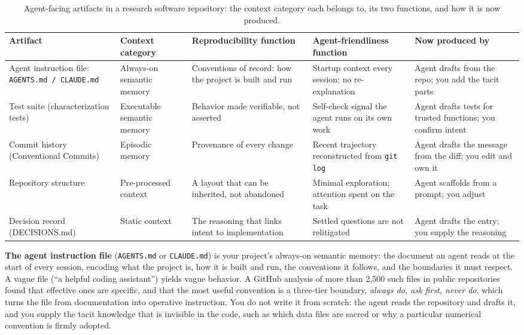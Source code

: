 \documentclass{IEEEcsmag}
\begin{document}
\begin{table}[t]
\caption{Agent-facing artifacts in a research software repository: the context category each belongs to, its two functions, and how it is now produced.}
\label{tab:artifacts}
\centering
\footnotesize
\setlength{\tabcolsep}{4pt}
\renewcommand{\arraystretch}{1.15}
\begin{tabularx}{\textwidth}{@{}*{5}{>{\raggedright\arraybackslash}X}@{}}
\toprule
\textbf{Artifact} & \textbf{Context category} & \textbf{Reproducibility function} & \textbf{Agent-friendliness function} & \textbf{Now produced by} \\
\midrule
Agent instruction file: \texttt{AGENTS.md / CLAUDE.md} & Always-on semantic memory & Conventions of record: how the project is built and run & Startup context every session; no re-explanation & Agent drafts from the repo; you add the tacit parts \\
Test suite (characterization tests) & Executable semantic memory & Behavior made verifiable, not asserted & Self-check signal the agent runs on its own work & Agent drafts tests for trusted functions; you confirm intent \\
Commit history (Conventional Commits) & Episodic memory & Provenance of every change & Recent trajectory reconstructed from \texttt{git log} & Agent drafts the message from the diff; you edit and own it \\
Repository structure & Pre-processed context & A layout that can be inherited, not abandoned & Minimal exploration; attention spent on the task & Agent scaffolds from a prompt; you adjust \\
Decision record (DECISIONS.md) & Static context & The reasoning that links intent to implementation & Settled questions are not relitigated & Agent drafts the entry; you supply the reasoning \\
\bottomrule
\end{tabularx}
\end{table}

\textbf{The agent instruction file} (\texttt{AGENTS.md} or \texttt{CLAUDE.md}) is your project's always-on semantic memory: the document an agent reads at the start of every session, encoding what the project is, how it is built and run, the conventions it follows, and the boundaries it must respect. A vague file (``a helpful coding assistant'') yields vague behavior. A GitHub analysis of more than 2,500 such files in public repositories found that effective ones are specific, and that the most useful convention is a three-tier boundary, \emph{always do, ask first, never do}, which turns the file from documentation into operative instruction.\cite{nigh2025} You do not write it from scratch: the agent reads the repository and drafts it, and you supply the tacit knowledge that is invisible in the code, such as which data files are sacred or why a particular numerical convention is firmly adopted.
\end{document}
